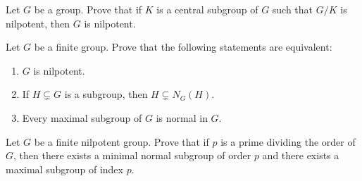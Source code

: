 \begin{prob}
\label{xca:nilpotente_central}
	Let $G$ be a group. Prove that if $K$ is a central subgroup of $G$ such that 
	$G/K$ is nilpotent, then $G$ is nilpotent.
\end{prob}




\begin{prob}
	\label{xca:normalizadora}
	Let $G$ be a finite group. Prove that the following statements are equivalent:  
	\begin{enumerate}
		\item $G$ is nilpotent.
		\item If $H\subsetneq G$ is a subgroup, then $H\subsetneq N_G(H)$.
		\item Every maximal subgroup of $G$ is normal in $G$.
	\end{enumerate}
\end{prob}



\begin{prob}
	Let $G$ be a finite nilpotent group. Prove that if $p$ is a prime dividing the order of $G$, then there
	exists a minimal normal subgroup of order $p$ and there exists a maximal subgroup of index $p$.
\end{prob}

